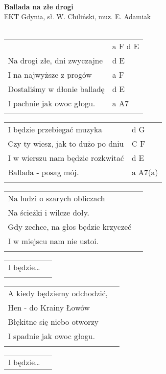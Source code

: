 \documentclass[a5paper]{article}
\begin{document}


\noindent
\fontsize{12pt}{15pt}\selectfont
\textbf{Ballada na złe drogi} \\
\fontsize{8pt}{10pt}\selectfont
EKT Gdynia, sł. W. Chiliński, muz. E. Adamiak \\ \\
\fontsize{10pt}{12pt}\selectfont
{}
\begin{tabular}{@{}p{8.5cm}p{3cm}@{}}
\noindent
& a F d E \\ 
Na drogi złe, dni zwyczajne & d E \\
I na najwyższe z progów & a F \\
Dostaliśmy w dłonie balladę & d E \\
I pachnie jak owoc głogu. & a A7 \\ \\
\end{tabular}

\noindent
\begin{tabular}{@{}p{7.5cm}p{3cm}@{}} 
I będzie przebiegać muzyka & d G \\
Czy ty wiesz, jak to dużo po dniu & C F \\
I w wierszu nam będzie rozkwitać & d E \\
Ballada - posag mój. & a A7(a) \\ \\
\end{tabular}

\noindent
\begin{tabular}{@{}p{8.5cm}p{3cm}@{}}
Na ludzi o szarych obliczach \\
Na ścieżki i wilcze doły. \\
Gdy zechce, na głos będzie krzyczeć \\
I w miejscu nam nie ustoi. \\ \\
\end{tabular}

\noindent
\begin{tabular}{@{}p{8.5cm}p{3cm}@{}}
I będzie… \\ \\
\end{tabular}

\noindent
\begin{tabular}{@{}p{8.5cm}p{3cm}@{}}
A kiedy będziemy odchodzić, \\
Hen - do Krainy Łowów \\
Błękitne się niebo otworzy \\
I spadnie jak owoc głogu. \\ \\
\end{tabular}

\noindent
\begin{tabular}{@{}p{8.5cm}p{3cm}@{}}
I będzie…
\end{tabular}
\end{document}
